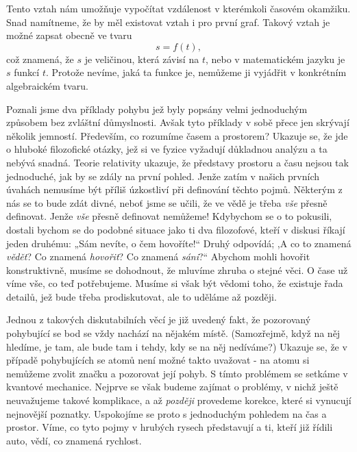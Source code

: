     Tento vztah nám umožňuje vypočítat vzdálenost v kterémkoli časovém okamžiku. Snad namítneme, že 
    by měl existovat vztah i pro první graf. Takový vztah je možné zapsat obecně ve tvaru
    \begin{equation}\label{fyz:eq112}
      s = f(t),
    \end{equation}
    což znamená, že \(s\) je veličinou, která závisí na \(t\), nebo v matematickém jazyku je \(s\) 
    funkcí \(t\). Protože nevíme, jaká ta funkce je, nemůžeme ji vyjádřit v konkrétním algebraickém 
    tvaru.

    Poznali jsme dva příklady pohybu jež byly popsány velmi jednoduchým způsobem bez zvláštní 
    důmyslnosti. Avšak tyto příklady v sobě přece jen skrývají několik jemností. Především, co 
    rozumíme časem a prostorem? Ukazuje se, že jde o hluboké filozofické otázky, jež si ve fyzice 
    vyžadují důkladnou analýzu a ta nebývá snadná. Teorie relativity ukazuje, že představy prostoru 
    a času nejsou tak jednoduché, jak by se zdály na první pohled. Jenže zatím v našich prvních 
    úvahách nemusíme být příliš úzkostliví při definování těchto pojmů. Některým z nás se to bude 
    zdát divné, neboť jsme se učili, že ve vědě je třeba \emph{vše} přesně definovat. Jenže 
    \emph{vše} přesně definovat nemůžeme! Kdybychom se o to pokusili, dostali bychom se do podobné 
    situace jako ti dva filozofové, kteří v diskusi říkají jeden druhému: „Sám nevíte, o čem 
    hovoříte!“ Druhý odpovídá; ,A co to znamená \emph{vědět}? Co znamená \emph{hovořit}? Co znamená 
    \emph{sáni}?“ Abychom mohli hovořit konstruktivně, musíme se dohodnout, že mluvíme zhruba o 
    stejné věci. O čase už víme vše, co teď potřebujeme. Musíme si však být vědomi toho, že 
    existuje řada detailů, jež bude třeba prodiskutovat, ale to uděláme až později.
    
    Jednou z takových diskutabilních věcí je již uvedený fakt, že pozorovaný pohybující se bod se 
    vždy nachází na nějakém místě. (Samozřejmě, když na něj hledíme, je tam, ale bude tam i tehdy, 
    kdy se na něj nedíváme?) Ukazuje se, že v případě pohybujících se atomů není možné takto 
    uvažovat - na atomu si nemůžeme zvolit značku a pozorovat její pohyb. S tímto problémem se 
    setkáme v kvantové mechanice. Nejprve se však budeme zajímat o problémy, v nichž ještě 
    neuvažujeme takové komplikace, a až \emph{později} provedeme korekce, které si vynucují 
    nejnovější poznatky. Uspokojíme se proto s jednoduchým pohledem na čas a prostor. Víme, co tyto 
    pojmy v hrubých rysech představují a ti, kteří již řídili auto, vědí, co znamená rychlost.
    
